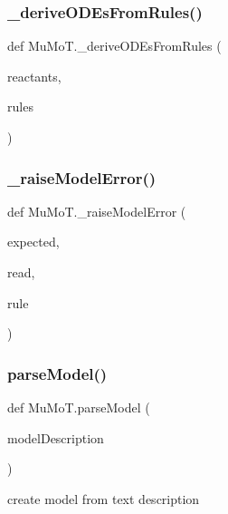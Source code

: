 \subsubsection{\texorpdfstring{\+\_\+derive\+O\+D\+Es\+From\+Rules()}{\_deriveODEsFromRules()}}
{\footnotesize\ttfamily def Mu\+Mo\+T.\+\_\+derive\+O\+D\+Es\+From\+Rules (\begin{DoxyParamCaption}\item[{}]{reactants,  }\item[{}]{rules }\end{DoxyParamCaption})\hspace{0.3cm}{\ttfamily [private]}}

\mbox{\label{namespace_mu_mo_t_a07dd350ff74bc1abafd7f44f972089a2}} 
\subsubsection{\texorpdfstring{\+\_\+raise\+Model\+Error()}{\_raiseModelError()}}
{\footnotesize\ttfamily def Mu\+Mo\+T.\+\_\+raise\+Model\+Error (\begin{DoxyParamCaption}\item[{}]{expected,  }\item[{}]{read,  }\item[{}]{rule }\end{DoxyParamCaption})\hspace{0.3cm}{\ttfamily [private]}}

\mbox{\label{namespace_mu_mo_t_a563aad4a460dbcc0705cf99bb6f6dd5d}} 
\subsubsection{\texorpdfstring{parse\+Model()}{parseModel()}}
{\footnotesize\ttfamily def Mu\+Mo\+T.\+parse\+Model (\begin{DoxyParamCaption}\item[{}]{model\+Description }\end{DoxyParamCaption})}



create model from text description 



